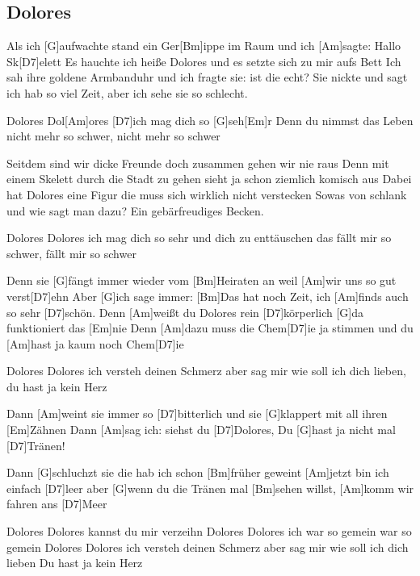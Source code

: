 \subsection*{Dolores   }
\begin{guitar}

Als ich [G]aufwachte stand ein Ger[Bm]ippe im Raum und ich [Am]sagte: Hallo Sk[D7]elett
Es hauchte ich heiße Dolores und es setzte sich zu mir aufs Bett
Ich sah ihre goldene Armbanduhr und ich fragte sie: ist die echt?
Sie nickte und sagt ich hab so viel Zeit, aber ich sehe sie so schlecht.



Dolores Dol[Am]ores [D7]ich mag dich so [G]seh[Em]r
Denn du nimmst das Leben nicht mehr so schwer, nicht mehr so schwer



Seitdem sind wir dicke Freunde doch zusammen gehen wir nie raus
Denn mit einem Skelett durch die Stadt zu gehen sieht ja schon ziemlich komisch aus
Dabei hat Dolores eine Figur die muss sich wirklich nicht verstecken
Sowas von schlank und wie sagt man dazu? Ein gebärfreudiges Becken.


Dolores Dolores ich mag dich so sehr
und dich zu enttäuschen das fällt mir so schwer, fällt mir so schwer


Denn sie [G]fängt immer wieder vom [Bm]Heiraten an weil [Am]wir uns so gut verst[D7]ehn
Aber [G]ich sage immer: [Bm]Das hat noch Zeit, ich [Am]finds auch so sehr [D7]schön.
Denn [Am]weißt du Dolores rein [D7]körperlich [G]da funktioniert das [Em]nie
Denn [Am]dazu muss die Chem[D7]ie ja stimmen und du [Am]hast ja kaum noch Chem[D7]ie



Dolores Dolores ich versteh deinen Schmerz
aber sag mir wie soll ich dich lieben, du hast ja kein Herz


Dann [Am]weint sie immer so [D7]bitterlich und sie [G]klappert mit all ihren [Em]Zähnen
Dann [Am]sag ich: siehst du [D7]Dolores, Du [G]hast ja nicht mal [D7]Tränen!



Dann [G]schluchzt sie die hab ich schon [Bm]früher geweint [Am]jetzt bin ich einfach [D7]leer
aber [G]wenn du die Tränen mal [Bm]sehen willst, [Am]komm wir fahren ans [D7]Meer



Dolores Dolores kannst du mir verzeihn
Dolores Dolores ich war so gemein war so gemein
Dolores Dolores ich versteh deinen Schmerz
aber sag mir wie soll ich dich lieben
Du hast ja kein Herz 
\end{guitar}
